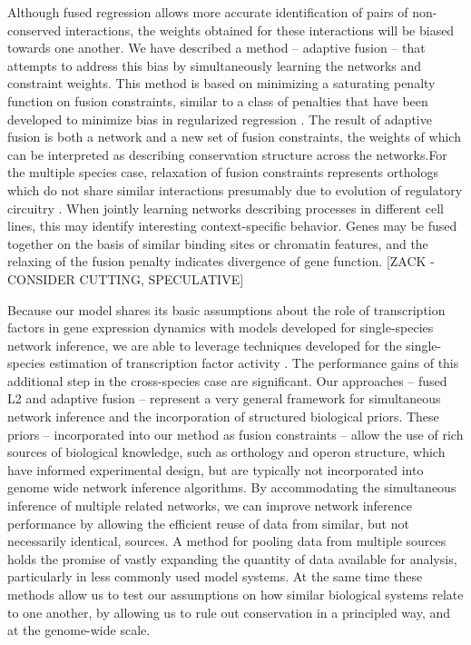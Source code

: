 \documentclass[11pt]{article}
\begin{document}
Although fused regression allows more accurate identification of pairs of non-conserved interactions, the weights obtained for these interactions will be biased towards one another. We have described a method -- adaptive fusion -- that attempts to address this bias by simultaneously learning the networks and constraint weights. This method is based on minimizing a saturating penalty function on fusion constraints, similar to a class of penalties that have been developed to minimize bias in regularized regression \cite{fan2001variable,zhang2010nearly}. 
The result of adaptive fusion is both a network and a new set of fusion constraints, the weights of which can be interpreted as describing conservation structure across the networks.For the multiple species case, relaxation of fusion constraints represents orthologs which do not share similar interactions presumably due to evolution of regulatory circuitry \cite{kellis_proof_2004}. %
When jointly learning networks describing processes in different cell lines, this may identify interesting context-specific behavior. Genes may be fused together on the basis of similar binding sites or chromatin features, and the relaxing of the fusion penalty indicates divergence of gene function. [ZACK - CONSIDER CUTTING, SPECULATIVE]

Because our model shares its basic assumptions about the role of transcription factors in gene expression dynamics with models developed for single-species network inference, we are able to leverage techniques developed for the single-species estimation of transcription factor activity \cite{fu_reconstructing_2011}. 
The performance gains of this additional step in the cross-species case are significant.
Our approaches -- fused L2 and adaptive fusion -- represent a very general framework for simultaneous network inference and the incorporation of structured biological priors. 
These priors -- incorporated into our method as fusion constraints -- allow the use of rich sources of biological knowledge, such as orthology and operon structure, which have informed experimental design, but are typically not incorporated into genome wide network inference algorithms. 
By accommodating the simultaneous inference of multiple related networks, we can improve network inference performance by allowing the efficient reuse of data from similar, but not necessarily identical, sources. 
A method for pooling data from multiple sources holds the promise of vastly expanding the quantity of data available for analysis, particularly in less commonly used model systems. 
At the same time these methods allow us to test our assumptions on how similar biological systems relate to one another, by allowing us to rule out conservation in a principled way, and at the genome-wide scale. 
\end{document}
